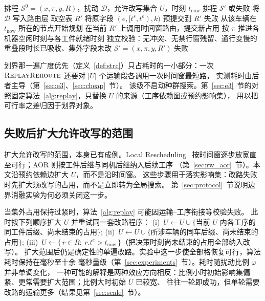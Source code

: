 \begin{algorithm}[t]
\caption{第 1 级改路重放 \(\textsc{ReplayReroute}\)}
\label{alg:replay}
\begin{algorithmic}[1]
\Require 排程 \(\mathcal{S}^0=(x,\pi,y,R)\)，扰动 \(\mathcal{D}\)，允许改写集合 \(U\)，时刻 \(t_{\mathrm{now}}\)
\Ensure 排程 \(\mathcal{S}'\) 或失败
\State 将 \(\mathcal{D}\) 写入路由层
\State 取空表 \(R'\)
  \State 将原字段 \((e,[t^s,t^e),k)\) 预提交到 \(R'\)
    \State \Return 失败
  \EndIf
\EndFor
{}
  \State 从该车辆在 \(t_{\mathrm{now}}\) 所在的节点开始规划 
  \State 在当前 \(R'\) 上调用时间窗路由，提交新占用
\EndFor
\State 按 \(\pi\) 推进各机器空闲时刻与各工件就绪时刻
\State 独立校验：无冲突、无禁行窗残留、通行变慢的重叠段时长已吸收、集外字段未改
  \State \Return \(\mathcal{S}'=(x,\pi,y,R')\)
\Else
  \State \Return 失败
\EndIf
\end{algorithmic}
\end{algorithm}

划界那一遍广度优先（定义~\ref{def:strc}）只占耗时的一小部分：一次
\(\textsc{ReplayReroute}\) 还要对 \(|U|\) 个运输段各调用一次时间窗最短路，
实测耗时由后者主导（第~\ref{sec:e3}、\ref{sec:cheap}~节）。
该级不启动种群搜索。第~\ref{sec:e3}~节的对照固定算法~\ref{alg:replay}，只替换 \(U\) 的来源（工序依赖图或预约影响集），
用以把可行率之差归因于划界对象。

\subsection{失败后扩大允许改写的范围}
\label{sec:scope_escalation}

扩大允许改写的范围，本身已有成例。Local Rescheduling~\cite{kuster2007local}
按时间窗逐步放宽直至可行；AOR 则按工件后继与同机后继纳入后续工序
（第~\ref{sec:rw_aor}~节）。本文沿预约依赖边扩大 \(U\)，而不是沿时间窗。
这些步骤用于落实影响集：改路失败时先扩大须改写的占用，而不是立即转为全局搜索。
第~\ref{sec:protocol}~节说明边界消融实验为何必须关闭这一步。

当集外占用保持过紧时，算法~\ref{alg:replay} 可能因运输--工序衔接等校验失败。
此时按下列顺序扩大 \(U\) 并重试同一套改路程序：
(i)~\(U\leftarrow U\cup\{\)当前 \(U\) 内各工序的同工件后缀、尚未结束的占用\(\}\);
(ii)~\(U\leftarrow U\cup\{\)所涉车辆的同车后缀、尚未结束的占用\(\}\);
(iii)~\(U\leftarrow\{\,r\in R:\ r.t^e>t_{\mathrm{now}}\,\}\)（把决策时刻尚未结束的占用全部纳入改写）。
扩大范围后仍是确定性的单遍改路。实验中这一步使全部格恢复可行，算法耗时保持在毫秒至十余
毫秒量级（第~\ref{sec:experiments}~节）。耗时随扰动比例 \(\varphi\) 并非单调变化，
一种可能的解释是两种效应方向相反：比例小时初始影响集偏紧、更常需要扩大范围；比例大时初始 \(U\) 已较宽、
往往一轮即成功，但单轮需要改路的运输更多（结果见第~\ref{sec:scale}~节）。

